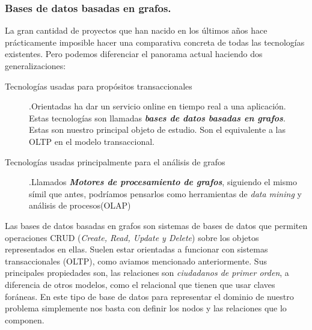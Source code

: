 \documentclass[12pt]{article} %
\begin{document}
\subsubsection{Bases de datos basadas en grafos.}
La gran cantidad de proyectos que han nacido en los últimos años hace prácticamente imposible hacer una comparativa concreta de todas las tecnologías existentes. Pero podemos diferenciar el panorama actual haciendo dos generalizaciones:
\begin{description}
\item[Tecnologías usadas para propósitos transaccionales].\linebreak Orientadas ha dar un servicio online en tiempo real a una aplicación.
\linebreak Estas tecnologías son llamadas \textbf\textit{bases de datos basadas en grafos}. Estas son nuestro principal objeto de estudio. Son el equivalente a las OLTP en el modelo transaccional.
\item[Tecnologías usadas principalmente para el análisis de grafos].\linebreak Llamados \textbf\textit{Motores de procesamiento de grafos}, siguiendo el mismo símil que antes, podríamos pensarlos como herramientas de \textit{data mining} y análisis de procesos(OLAP)
\end{description}

\noindent{}

Las bases de datos basadas en grafos son sistemas de bases de datos que permiten operaciones CRUD (\textit{Create, Read, Update y Delete}) sobre los objetos representados en ellas. Suelen estar orientadas a funcionar con sistemas transaccionales (OLTP), como aviamos mencionado anteriormente. Sus principales propiedades son, las relaciones son \textit{ciudadanos de primer orden}, a diferencia de otros modelos, como el relacional que tienen que usar claves foráneas. En este tipo de base de datos para representar el dominio de nuestro problema simplemente nos basta con definir los nodos y las relaciones que lo componen.
\end{document}
